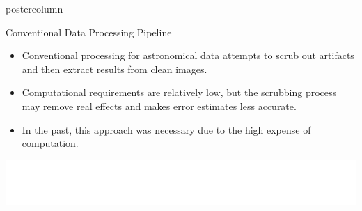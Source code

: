 \documentclass[final,hyperref={pdfpagelabels=false}]{beamer}
\begin{document}
\begin{frame}
\begin{columns}
\begin{column}{.49\textwidth}
\begin{beamercolorbox}[center,wd=\textwidth]{postercolumn}
\begin{minipage}[T]{.95\textwidth}
{            \vspace{2cm}
            \begin{block}{Conventional Data Processing Pipeline}
            \begin{itemize}
              	\item Conventional processing for astronomical data attempts to scrub out artifacts and then extract results from clean images.
		\item Computational requirements are relatively low, but the scrubbing process may remove real effects and makes error estimates less accurate.
		\item In the past, this approach was necessary due to the high expense of computation.
	    \end{itemize}
	      \begin{center}
              \includegraphics[width=0.75\linewidth]{figures/Conventional_Pipeline.pdf}
              \end{center}
            \end{block}

}
\end{minipage}
\end{beamercolorbox}
\end{column}
\end{columns}
\end{frame}
\end{document}
